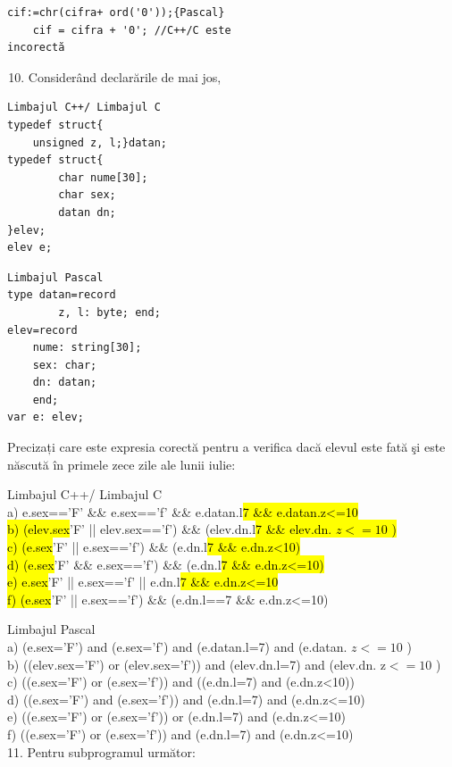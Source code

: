 \documentclass[10pt]{article}
\begin{document}
\begin{verbatim}
cif:=chr(cifra+ ord('0'));{Pascal}
    cif = cifra + '0'; //C++/C este
incorectă
\end{verbatim}

\begin{enumerate}
  \setcounter{enumi}{9}
  \item Considerând declarările de mai jos,
\end{enumerate}

\begin{verbatim}
Limbajul C++/ Limbajul C
typedef struct{
    unsigned z, l;}datan;
typedef struct{
        char nume[30];
        char sex;
        datan dn;
}elev;
elev e;
\end{verbatim}

\begin{verbatim}
Limbajul Pascal
type datan=record
        z, l: byte; end;
elev=record
    nume: string[30];
    sex: char;
    dn: datan;
    end;
var e: elev;
\end{verbatim}

Precizați care este expresia corectă pentru a verifica dacă elevul este fată şi este născută în primele zece zile ale lunii iulie:

Limbajul C++/ Limbajul C\\
a) e.sex=='F' \&\& e.sex=='f' \&\& e.datan.l\hl{7 \&\& e.datan.z<=10\\
b) (elev.sex}'F' || elev.sex=='f') \&\& (elev.dn.l\hl{7 \&\& elev.dn. $z<=10$ )\\
c) (e.sex}'F' || e.sex=='f') \&\& (e.dn.l\hl{7 \&\& e.dn.z<10)\\
d) (e.sex}'F' \&\& e.sex=='f') \&\& (e.dn.l\hl{7 \&\& e.dn.z<=10)\\
e) e.sex}'F' || e.sex=='f' || e.dn.l\hl{7 \&\& e.dn.z<=10\\
f) (e.sex}'F' || e.sex=='f') \&\& (e.dn.l==7 \&\& e.dn.z<=10)

Limbajul Pascal\\
a) (e.sex='F') and (e.sex='f') and (e.datan.l=7) and (e.datan. $z<=10$ )\\
b) ((elev.sex='F') or (elev.sex='f')) and (elev.dn.l=7) and (elev.dn. $\mathrm{z}<=10$ )\\
c) ((e.sex='F') or (e.sex='f')) and ((e.dn.l=7) and (e.dn.z<10))\\
d) ((e.sex='F') and (e.sex='f')) and (e.dn.l=7) and (e.dn.z<=10)\\
e) ((e.sex='F') or (e.sex='f')) or (e.dn.l=7) and (e.dn.z<=10)\\
f) ((e.sex='F') or (e.sex='f')) and (e.dn.l=7) and (e.dn.z<=10)\\
11. Pentru subprogramul următor:
\end{document}
